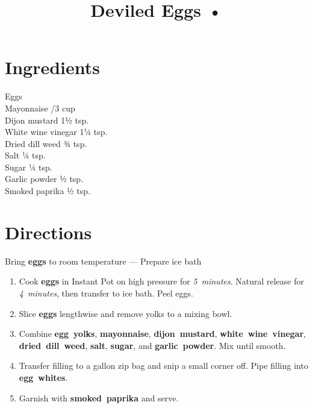 \documentclass[11pt,letterpaper]{article}
\title{Deviled Eggs •}
\author{}
\date{}
\begin{document}
\maketitle
\thispagestyle{empty}

\section*{Ingredients}
\setlength{\columnsep}{20pt}
\begin{multicols}{2}
\noindent
    Eggs  \\
    Mayonnaise /3 cup \\
    Dijon mustard \dotfill 1½ tsp. \\
    White wine vinegar \dotfill 1¼ tsp. \\
    \columnbreak
    Dried dill weed \dotfill ¾ tsp. \\
    Salt \dotfill ¼ tsp. \\
    Sugar \dotfill ¼ tsp. \\
    Garlic powder \dotfill ½ tsp. \\
    Smoked paprika \dotfill ½ tsp. \\
\end{multicols}

\section*{Directions}

\noindent
Bring \textbf{eggs} to room temperature ---
Prepare ice bath

\begin{enumerate}
    \item Cook \textbf{eggs} in Instant Pot on high pressure for \textit{5~minutes}. Natural release for \textit{4~minutes}, then transfer to ice bath. Peel eggs.
    
    \item Slice \textbf{eggs} lengthwise and remove yolks to a mixing bowl.
    
    \item Combine \textbf{egg~yolks}, \textbf{mayonnaise}, \textbf{dijon~mustard}, \textbf{white~wine~vinegar}, \textbf{dried~dill~weed}, \textbf{salt}, \textbf{sugar}, and \textbf{garlic~powder}. Mix until smooth.
    
    \item Transfer filling to a gallon zip bag and snip a small corner off. Pipe filling into \textbf{egg~whites}.
    
    \item Garnish with \textbf{smoked~paprika} and serve.
\end{enumerate}
\end{document}

